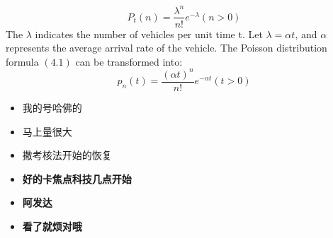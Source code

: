 \begin{equation}
{P_t}(n) = \frac{{{\lambda ^n}}}{{n!}}{e^{ - \lambda }}(n > 0)
\end{equation}
The $\lambda$ indicates the number of vehicles per unit time t. Let $ \lambda = \alpha t $, and $\alpha$ represents the average arrival rate of the vehicle. The Poisson distribution formula $(4.1)$ can be transformed into:
 \begin{equation}
{p_n}(t) = \frac{{{{(\alpha t)}^n}}}{{n!}}{e^{ - \alpha t}}(t > 0)
\end{equation}

\begin{itemize}
\item  我的号哈佛的
\item  马上量很大
\item  撒考核法开始的恢复
\end{itemize}


\begin{itemize}
\item \textbf{好的卡焦点科技几点开始}
\item \textbf{阿发达}
\item \textbf{看了就烦对哦}
\end{itemize}